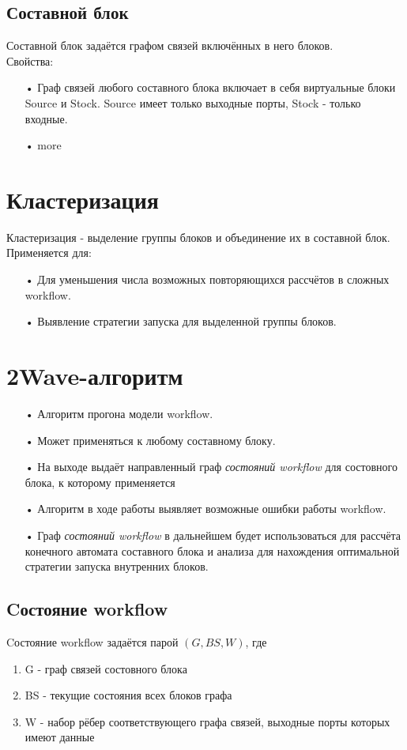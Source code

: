 \documentclass[a4paper,14pt]{article}
\begin{document}
\subsection{Составной блок}
Составной блок задаётся графом связей включённых в него блоков.%
\\
Свойства:
\begin{enumerate}
\item[•] Граф связей любого составного блока включает в себя виртуальные блоки  Source и Stock. Source имеет только выходные порты,  Stock  - только входные.
\item[•] more
\end{enumerate}

\newpage
\section{Кластеризация}
Кластеризация - выделение группы блоков и объединение их в составной блок.
\\
Применяется для:
\begin{enumerate}
\item[•] Для уменьшения числа возможных повторяющихся рассчётов в сложных workflow.
\item[•] Выявление стратегии запуска для выделенной группы блоков.
\end{enumerate}

\newpage
\section{2Wave-алгоритм}
\begin{enumerate}
\item[•] Алгоритм прогона модели workflow.
\item[•] Может применяться к любому составному блоку.
\item[•] На выходе выдаёт направленный граф \textit{ состояний workflow} для состовного блока, к которому применяется
\item[•] Алгоритм в ходе работы выявляет возможные ошибки работы workflow.
\item[•] Граф \textit{состояний workflow} в дальнейшем будет использоваться для рассчёта конечного автомата составного блока и анализа для нахождения оптимальной стратегии запуска внутренних блоков. 
\end{enumerate}

\subsection{Cостояние workflow}
Cостояние workflow задаётся парой $(G, BS, W)$, где
\begin{enumerate}
\item G - граф связей состовного блока
\item BS - текущие состояния всех блоков графа
\item W - набор рёбер соответствующего графа связей, выходные порты которых имеют данные
\end{enumerate}
\end{document}
